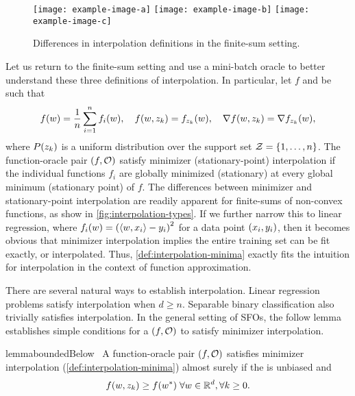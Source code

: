 \begin{figure}[]
    \centering
    \texttt{[image: example-image-a]}
    \texttt{[image: example-image-b]}
    \texttt{[image: example-image-c]}
    \caption{Differences in interpolation definitions in the finite-sum setting.}%
    \label{fig:interpolation-types}
\end{figure}

Let us return to the finite-sum setting and use a mini-batch oracle to better understand these three definitions of interpolation.
In particular, let \( f \) and \oracle{} be such that
\[ f(\w) =  \frac{1}{n} \sum_{i=1}^{n} f_i(\w), \quad f(\w, \zk) = f_{\zk}(\w), \quad \grad(\w, \zk) = \grad_{\zk}(\w),  \]
where \( P(\zk) \) is a uniform distribution over the support set \( \calZ = \cbr{1, \ldots, n} \).
The function-oracle pair \( \rbr{f, \oracle{}} \) satisfy minimizer (stationary-point) interpolation if the individual functions \( f_i \) are globally minimized (stationary) at every global minimum (stationary point) of \( f \).
The differences between minimizer and stationary-point interpolation are readily apparent for finite-sums of non-convex functions, as show in \autoref{fig:interpolation-types}.
If we further narrow this to linear regression, where \( f_i(\w) = \rbr{\abr{\w, x_i} - y_i}^2 \) for a data point \( \rbr{x_i, y_i} \), then it becomes obvious that minimizer interpolation implies the entire training set can be fit exactly, or interpolated.
Thus, \autoref{def:interpolation-minima} exactly fits the intuition for interpolation in the context of function approximation.

There are several natural ways to establish interpolation.
Linear regression problems satisfy interpolation when \( d \geq n \).
Separable binary classification also trivially satisfies interpolation.
In the general setting of SFOs, the follow lemma establishes simple conditions for a \( \rbr{f, \oracle{}} \) to satisfy minimizer interpolation.
\begin{restatable}{lemma}{boundedBelow}~\label{thm:bounded-below}
    A function-oracle pair \( \rbr{f, \oracle{}} \) satisfies minimizer interpolation (\autoref{def:interpolation-minima}) almost surely if the \oracle{} is unbiased and
    \[ f(\w, \zk ) \geq f(\wopt) \; \forall \w \in \R^d, \forall k \geq 0. \]
\end{restatable}
\\

